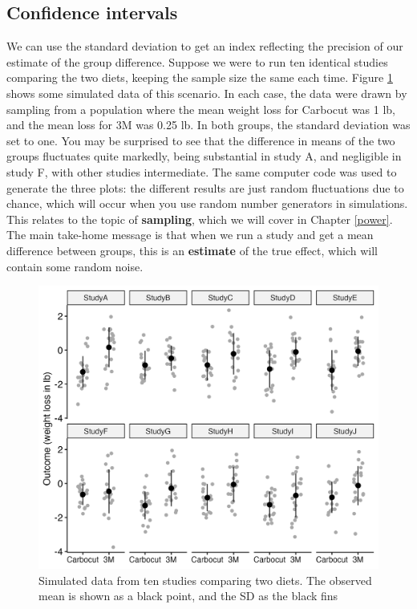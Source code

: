 \documentclass{krantz}
\begin{document}
\hypertarget{confidence-intervals}{%
\subsection{Confidence intervals}\label{confidence-intervals}}

We can use the standard deviation to get an index reflecting the precision of our estimate of the group difference. Suppose we were to run ten identical studies comparing the two diets, keeping the sample size the same each time. Figure \ref{fig:demo-variation2} shows some simulated data of this scenario. In each case, the data were drawn by sampling from a population where the mean weight loss for Carbocut was 1 lb, and the mean loss for 3M was 0.25 lb. In both groups, the standard deviation was set to one. You may be surprised to see that the difference in means of the two groups fluctuates quite markedly, being substantial in study A, and negligible in study F, with other studies intermediate. The same computer code was used to generate the three plots: the different results are just random fluctuations due to chance, which will occur when you use random number generators in simulations. This relates to the topic of \textbf{sampling}, which we will cover in Chapter \ref{power}. The main take-home message is that when we run a study and get a mean difference between groups, this is an \textbf{estimate} of the true effect, which will contain some random noise.

\begin{figure}
\includegraphics[width=0.9\linewidth]{images_bw/carbo10gp} \caption{Simulated data from ten studies comparing two diets. The observed mean is shown as a black point, and the SD as the black fins}\label{fig:demo-variation2}
\end{figure}
\end{document}
